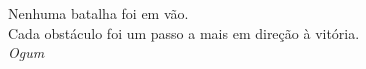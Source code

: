
\begin{epigrafe}
    \vspace*{\fill}
    \begin{flushright}
        Nenhuma batalha foi em vão.\\
        Cada obstáculo foi um passo a mais em direção à vitória.\\
        \vspace{0.5em}
        \textit{Ogum}
    \end{flushright}
\end{epigrafe}